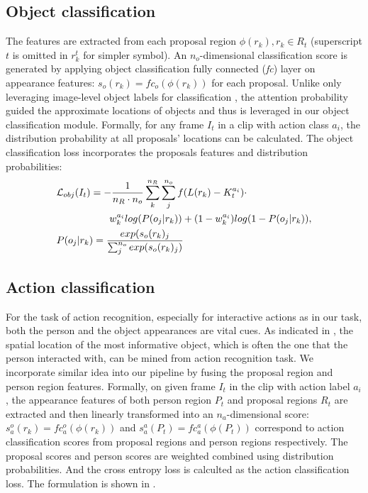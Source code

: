 \subsection{Object classification}
The features are extracted from each proposal region $\phi(r_k), r_k \in R_t$ (superscript $t$ is omitted in $r_k^t$ for simpler symbol). An $n_o$-dimensional classification score is generated by applying object classification fully connected (\textit{fc}) layer on appearance features: $s_o(r_k) = fc_o(\phi(r_k))$ for each proposal. Unlike only leveraging image-level object labels for classification \cite{bilen2016weakly,kantorov2016contextlocnet}, the attention probability guided the approximate locations of objects and thus is leveraged in our object classification module. Formally, for any frame $I_t$ in a clip with action class $a_i$, the distribution probability at all proposals' locations can be calculated. The object classification loss incorporates the proposals features and distribution probabilities:
\begin{align}
\label{eqn:obj_cls_loss}
&{\mathcal L}_{obj} (I_t) = -\frac{1}{n_R\cdot n_o}\sum_{k}^{n_R}\sum_{j}^{n_o} f(L(r_k)-K_t^{a_i}) \cdot \nonumber \\
&~~~~~~~~~~~~~~~~w_k^{a_i}log(P(o_j|r_k))+(1-w_k^{a_i})log(1-P(o_j|r_k)), \nonumber\\
&P(o_j|r_k) = \frac{exp(s_o(r_k)_j}{\sum_{j}^{n_o}exp(s_o(r_k)_j)}
\end{align}

\subsection{Action classification}
For the task of action recognition, especially for interactive actions as in our task, both the person and the object appearances are vital cues. As indicated in \cite{gkioxari2015contextual}, the spatial location of the most informative object, which is often the one that the person interacted with, can be mined from action recognition task. We incorporate similar idea into our pipeline by fusing the proposal region and person region features. Formally, on given frame $I_t$ in the clip with action label $a_i$, the appearance features of both person region $P_t$ and proposal regions $R_t$ are extracted and then linearly transformed into an $n_a$-dimensional score: $s_a^o(r_k) = fc_a^o(\phi(r_k))$ and $s_a^a(P_t) = fc_a^a(\phi(P_t))$ correspond to action classification scores from proposal regions and person regions respectively. The proposal scores and person scores are weighted combined using distribution probabilities. And the cross entropy loss is calculted as the action classification loss. The formulation is shown in .

